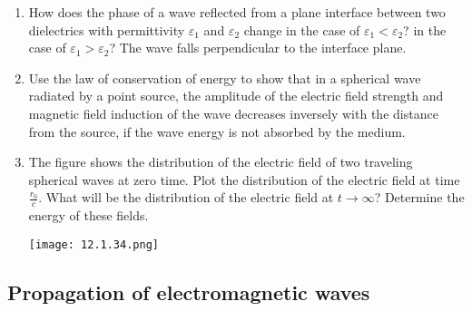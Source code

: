 \documentclass{article}
\begin{document}
\begin{enumerate}[label=12.1.\arabic*]
\item How does the phase of a wave reflected from a plane interface between two dielectrics with permittivity $\varepsilon_1$ and $\varepsilon_2$ change in the case of $\varepsilon_1 < \varepsilon_2$? in the case of $\varepsilon_1 > \varepsilon_2$? The wave falls perpendicular to the interface plane.

\item Use the law of conservation of energy to show that in a spherical wave radiated by a point source, the amplitude of the electric field strength and magnetic field induction of the wave decreases inversely with the distance from the source, if the wave energy is not absorbed by the medium.

\item The figure shows the distribution of the electric field of two traveling spherical waves at zero time. Plot the distribution of the electric field at time $\frac{r_0}{c}$. What will be the distribution of the electric field at $t \to \infty$? Determine the energy of these fields.

\begin{center}
    \texttt{[image: 12.1.34.png]}
\end{center}




\end{enumerate}
\subsection{Propagation of electromagnetic waves}
\end{document}
